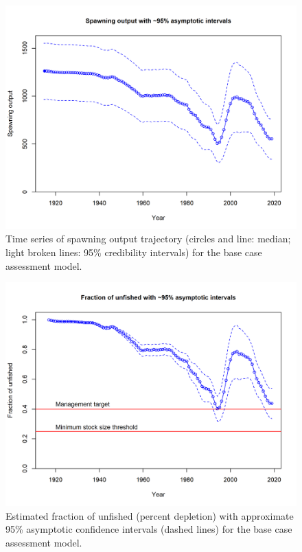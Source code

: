 \documentclass[12pt,]{article}
\begin{document}
\FloatBarrier

\begin{figure}
\centering
\includegraphics{r4ss/plots_mod1/ts7_Spawning_output_with_95_asymptotic_intervals_intervals.png}
\caption{Time series of spawning output trajectory (circles and line:
median; light broken lines: 95\% credibility intervals) for the base
case assessment model. \label{fig:Spawnbio_all}}
\end{figure}

\begin{figure}
\centering
\includegraphics{r4ss/plots_mod1/ts9_Fraction_of_unfished_with_95_asymptotic_intervals_intervals.png}
\caption{Estimated fraction of unfished (percent depletion) with
approximate 95\% asymptotic confidence intervals (dashed lines) for the
base case assessment model. \label{fig:RelDeplete_all}}
\end{figure}
\end{document}
